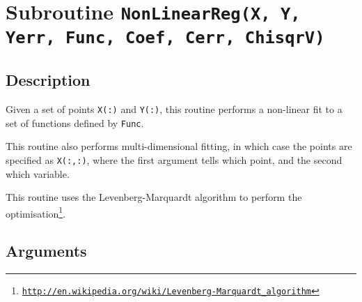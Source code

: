 \section{Subroutine \texttt{NonLinearReg(X, Y, Yerr, Func, Coef, Cerr, ChisqrV)}} 

\subsection{Description}

Given a set of points \texttt{X(:)} and \texttt{Y(:)}, this routine
performs a non-linear fit to a set of functions defined by
\texttt{Func}.  

This routine also performs multi-dimensional fitting, in which case
the points are specified as \texttt{X(:,:)}, where the first argument
tells which point, and the second which variable.

This routine uses the Levenberg-Marquardt algorithm to perform the
optimisation\footnote{\href{http://en.wikipedia.org/wiki/Levenberg-Marquardt_algorithm}{\texttt{http://en.wikipedia.org/wiki/Levenberg-Marquardt\_algorithm}}}. 

\subsection{Arguments}

